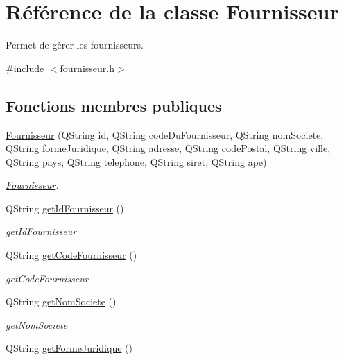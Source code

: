 \hypertarget{class_fournisseur}{}\section{Référence de la classe Fournisseur}
\label{class_fournisseur}


Permet de gèrer les fournisseurs.  




{\ttfamily \#include $<$fournisseur.\+h$>$}

\subsection*{Fonctions membres publiques}
\begin{DoxyCompactItemize}
\item 
\mbox{\hyperlink{class_fournisseur_a301b2476cc5f6f4c5ab220712dba8bf0}{Fournisseur}} (Q\+String id, Q\+String code\+Du\+Fournisseur, Q\+String nom\+Societe, Q\+String forme\+Juridique, Q\+String adresse, Q\+String code\+Postal, Q\+String ville, Q\+String pays, Q\+String telephone, Q\+String siret, Q\+String ape)
\begin{DoxyCompactList}\small\item\em \mbox{\hyperlink{class_fournisseur}{Fournisseur}}. \end{DoxyCompactList}\item 
Q\+String \mbox{\hyperlink{class_fournisseur_ae7ccf2a255b2ce31d88703dc5c28798d}{get\+Id\+Fournisseur}} ()
\begin{DoxyCompactList}\small\item\em get\+Id\+Fournisseur \end{DoxyCompactList}\item 
Q\+String \mbox{\hyperlink{class_fournisseur_a4ade53722bfbacf27e48f656ac74c6ee}{get\+Code\+Fournisseur}} ()
\begin{DoxyCompactList}\small\item\em get\+Code\+Fournisseur \end{DoxyCompactList}\item 
Q\+String \mbox{\hyperlink{class_fournisseur_ae83d27670f38c39d2ea4a3979e87c979}{get\+Nom\+Societe}} ()
\begin{DoxyCompactList}\small\item\em get\+Nom\+Societe \end{DoxyCompactList}\item 
Q\+String \mbox{\hyperlink{class_fournisseur_a5676a3819da9e28dbfc67f26f82ac9f5}{get\+Forme\+Juridique}} ()

\end{DoxyCompactItemize}
